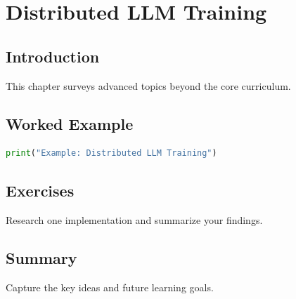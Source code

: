 \chapter{Distributed LLM Training}
\label{chap:vol13-4}



\section{Introduction}
This chapter surveys advanced topics beyond the core curriculum.

\section{Worked Example}
\begin{lstlisting}[language=Python]
print("Example: Distributed LLM Training")
\end{lstlisting}

\section{Exercises}
\begin{exercise}
Research one implementation and summarize your findings.
\end{exercise}

\section{Summary}
Capture the key ideas and future learning goals.
